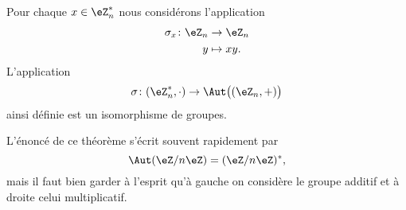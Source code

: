 \begin{theorem}   \label{ThoozyeSn}
    Pour chaque \( x\in \eZ_n^*\) nous considérons l'application
    \begin{equation}
        \begin{aligned}
            \sigma_x\colon \eZ_n&\to \eZ_n \\
            y&\mapsto xy. 
        \end{aligned}
    \end{equation}
    L'application
    \begin{equation}
        \sigma\colon (\eZ_n^*,\cdot)\to \Aut\big( (\eZ_n,+) \big)
    \end{equation}
    ainsi définie est un isomorphisme de groupes.
\end{theorem}
L'énoncé de ce théorème s'écrit souvent rapidement par 
\begin{equation}
    \Aut(\eZ/n\eZ)=(\eZ/n\eZ)^*,
\end{equation}
mais il faut bien garder à l'esprit qu'à gauche on considère le groupe additif et à droite celui multiplicatif.

